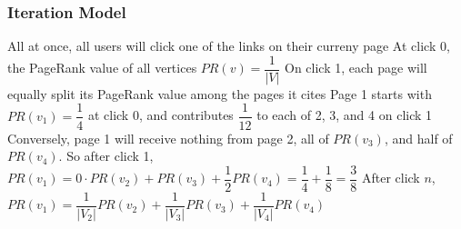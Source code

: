 \documentclass{beamer}
\begin{document}
\begin{frame}[t]
\frametitle{Iteration Model}
\begin{outline}
    \1 All at once, all users will click one of the links on their curreny page
    \1 At click 0, the PageRank value of all vertices $PR(v) = \dfrac{1}{|V|}$
    \1 On click 1, each page will equally split its PageRank value among the pages it cites
    \1 Page 1 starts with $PR(v_1) = \dfrac{1}{4}$ at click 0, and contributes $\dfrac{1}{12}$ to each of 2, 3, and 4 on click 1
    \1 Conversely, page 1 will receive nothing from page 2, all of $PR(v_3)$, and half of $PR(v_4)$. So after click 1, $PR(v_1) = 0\cdot PR(v_2) + PR(v_3) + \dfrac{1}{2}PR(v_4) = \dfrac{1}{4} + \dfrac{1}{8} = \dfrac{3}{8}$
    \1 After click $n$, $PR(v_1) = \dfrac{1}{|V_2|}PR(v_2) + \dfrac{1}{|V_3|}PR(v_3) + \dfrac{1}{|V_4|}PR(v_4)$
\end{outline}
\end{frame}



\end{document}
